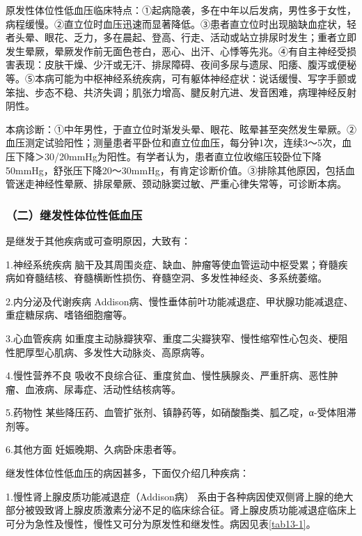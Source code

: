 原发性体位性低血压临床特点：①起病隐袭，多在中年以后发病，男性多于女性，病程缓慢。②直立位时血压迅速而显著降低。③患者直立位时出现脑缺血症状，轻者头晕、眼花、乏力，多在晨起、登高、行走、活动或站立排尿时发生；重者立即发生晕厥，晕厥发作前无面色苍白，恶心、出汗、心悸等先兆。④有自主神经受损害表现：皮肤干燥、少汗或无汗、排尿障碍、夜间多尿与遗尿、阳痿、腹泻或便秘等。⑤本病可能为中枢神经系统疾病，可有躯体神经症状：说话缓慢、写字手颤或笨拙、步态不稳、共济失调；肌张力增高、腱反射亢进、发音困难，病理神经反射阴性。

本病诊断：①中年男性，于直立位时渐发头晕、眼花、眩晕甚至突然发生晕厥。②血压测定试验阳性；测量患者平卧位和直立位血压，每分钟1次，连续3～5次，血压下降＞30/20mmHg为阳性。有学者认为，患者直立位收缩压较卧位下降50mmHg，舒张压下降20～30mmHg，有肯定诊断价值。③排除其他原因，包括血管迷走神经性晕厥、排尿晕厥、颈动脉窦过敏、严重心律失常等，可诊断本病。

\subsubsection{（二）继发性体位性低血压}

是继发于其他疾病或可查明原因，大致有：

1.神经系统疾病
脑干及其周围炎症、缺血、肿瘤等使血管运动中枢受累；脊髓疾病如脊髓结核、脊髓横断性损伤、脊髓空洞、多发性神经炎、多系统萎缩。

2.内分泌及代谢疾病
Addison病、慢性垂体前叶功能减退症、甲状腺功能减退症、重症糖尿病、嗜铬细胞瘤等。

3.心血管疾病
如重度主动脉瓣狭窄、重度二尖瓣狭窄、慢性缩窄性心包炎、梗阻性肥厚型心肌病、多发性大动脉炎、高原病等。

4.慢性营养不良
吸收不良综合征、重度贫血、慢性胰腺炎、严重肝病、恶性肿瘤、血液病、尿毒症、活动性结核病等。

5.药物性
某些降压药、血管扩张剂、镇静药等，如硝酸酯类、胍乙啶，α-受体阻滞剂等。

6.其他方面 妊娠晚期、久病卧床患者等。

继发性体位性低血压的病因甚多，下面仅介绍几种疾病：

1.慢性肾上腺皮质功能减退症（Addison病）
系由于各种病因使双侧肾上腺的绝大部分被毁致肾上腺皮质激素分泌不足的临床综合征。肾上腺皮质功能减退症临床上可分为急性及慢性，慢性又可分为原发性和继发性。病因见表\ref{tab13-1}。

